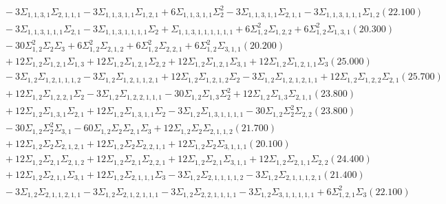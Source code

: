 \documentclass[12pt]{article}
\begin{document}
\begin{landscape}
\begin{align*}
		&\quad\quad -3\Sigma_{1,1,3,1}\Sigma_{2,1,1,1}-3\Sigma_{1,1,3,1,1}\Sigma_{1,2,1}+6\Sigma_{1,1,3,1,1}\Sigma_{2}^{2}-3\Sigma_{1,1,3,1,1}\Sigma_{2,1,1}-3\Sigma_{1,1,3,1,1,1}\Sigma_{1,2}(22.100) \\ 
		&\quad\quad -3\Sigma_{1,1,3,1,1,1}\Sigma_{2,1}-3\Sigma_{1,1,3,1,1,1,1}\Sigma_{2}+\Sigma_{1,1,3,1,1,1,1,1,1}+6\Sigma_{1,2}^{2}\Sigma_{1,2,2}+6\Sigma_{1,2}^{2}\Sigma_{1,3,1}(20.300) \\ 
		&\quad\quad -30\Sigma_{1,2}^{2}\Sigma_{2}\Sigma_{3}+6\Sigma_{1,2}^{2}\Sigma_{2,1,2}+6\Sigma_{1,2}^{2}\Sigma_{2,2,1}+6\Sigma_{1,2}^{2}\Sigma_{3,1,1}(20.200) \\ 
		&\quad\quad +12\Sigma_{1,2}\Sigma_{1,2,1}\Sigma_{1,3}+12\Sigma_{1,2}\Sigma_{1,2,1}\Sigma_{2,2}+12\Sigma_{1,2}\Sigma_{1,2,1}\Sigma_{3,1}+12\Sigma_{1,2}\Sigma_{1,2,1,1}\Sigma_{3}(25.000) \\ 
		&\quad\quad -3\Sigma_{1,2}\Sigma_{1,2,1,1,1,2}-3\Sigma_{1,2}\Sigma_{1,2,1,1,2,1}+12\Sigma_{1,2}\Sigma_{1,2,1,2}\Sigma_{2}-3\Sigma_{1,2}\Sigma_{1,2,1,2,1,1}+12\Sigma_{1,2}\Sigma_{1,2,2}\Sigma_{2,1}(25.700) \\ 
		&\quad\quad +12\Sigma_{1,2}\Sigma_{1,2,2,1}\Sigma_{2}-3\Sigma_{1,2}\Sigma_{1,2,2,1,1,1}-30\Sigma_{1,2}\Sigma_{1,3}\Sigma_{2}^{2}+12\Sigma_{1,2}\Sigma_{1,3}\Sigma_{2,1,1}(23.800) \\ 
		&\quad\quad +12\Sigma_{1,2}\Sigma_{1,3,1}\Sigma_{2,1}+12\Sigma_{1,2}\Sigma_{1,3,1,1}\Sigma_{2}-3\Sigma_{1,2}\Sigma_{1,3,1,1,1,1}-30\Sigma_{1,2}\Sigma_{2}^{2}\Sigma_{2,2}(23.800) \\ 
		&\quad\quad -30\Sigma_{1,2}\Sigma_{2}^{2}\Sigma_{3,1}-60\Sigma_{1,2}\Sigma_{2}\Sigma_{2,1}\Sigma_{3}+12\Sigma_{1,2}\Sigma_{2}\Sigma_{2,1,1,2}(21.700) \\ 
		&\quad\quad +12\Sigma_{1,2}\Sigma_{2}\Sigma_{2,1,2,1}+12\Sigma_{1,2}\Sigma_{2}\Sigma_{2,2,1,1}+12\Sigma_{1,2}\Sigma_{2}\Sigma_{3,1,1,1}(20.100) \\ 
		&\quad\quad +12\Sigma_{1,2}\Sigma_{2,1}\Sigma_{2,1,2}+12\Sigma_{1,2}\Sigma_{2,1}\Sigma_{2,2,1}+12\Sigma_{1,2}\Sigma_{2,1}\Sigma_{3,1,1}+12\Sigma_{1,2}\Sigma_{2,1,1}\Sigma_{2,2}(24.400) \\ 
		&\quad\quad +12\Sigma_{1,2}\Sigma_{2,1,1}\Sigma_{3,1}+12\Sigma_{1,2}\Sigma_{2,1,1,1}\Sigma_{3}-3\Sigma_{1,2}\Sigma_{2,1,1,1,1,2}-3\Sigma_{1,2}\Sigma_{2,1,1,1,2,1}(21.400) \\ 
		&\quad\quad -3\Sigma_{1,2}\Sigma_{2,1,1,2,1,1}-3\Sigma_{1,2}\Sigma_{2,1,2,1,1,1}-3\Sigma_{1,2}\Sigma_{2,2,1,1,1,1}-3\Sigma_{1,2}\Sigma_{3,1,1,1,1,1}+6\Sigma_{1,2,1}^{2}\Sigma_{3}(22.100) \\ 

\end{align*}
\end{landscape}
\end{document}
